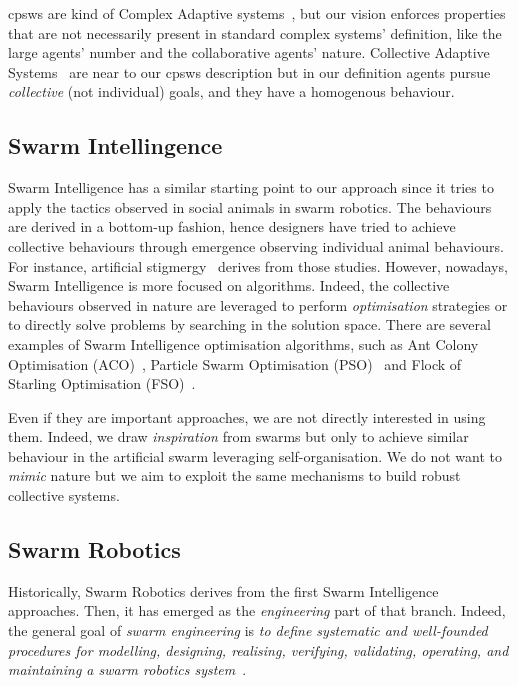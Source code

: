 \documentclass[11pt]{article}
\begin{document}
\acp{cpsw} are kind of Complex Adaptive systems~\cite{holland1992complex}, but our vision enforces properties that are not necessarily present in standard complex systems' definition, like the large agents' number and the collaborative agents' nature.
Collective Adaptive Systems~\cite{DBLP:journals/corr/abs-1108-5643} are near to our \acp{cpsw} description but in our definition agents pursue \emph{collective} (not individual) goals, and they have a homogenous behaviour.

\subsection{Swarm Intellingence}

Swarm Intelligence has a similar starting point to our approach since it tries to apply the tactics observed in social animals in swarm robotics. 
%
The behaviours are derived in a bottom-up fashion, hence designers have tried to achieve collective behaviours through emergence observing individual animal behaviours.
%
For instance, artificial stigmergy~\cite{DBLP:journals/fgcs/DorigoBT00} derives from those studies.
%
However, nowadays, Swarm Intelligence is more focused on algorithms.
% 
Indeed, the collective behaviours observed in nature are leveraged to perform \textit{optimisation} strategies or to directly solve problems by searching in the solution space.
There are several examples of Swarm Intelligence optimisation algorithms, such as Ant Colony Optimisation (ACO)~\cite{DBLP:journals/tsmc/DorigoMC96}, Particle Swarm Optimisation (PSO)~\cite{DBLP:conf/icnn/KennedyE95} and Flock of Starling Optimisation (FSO)~\cite{DBLP:series/sci/FulgineiS11}.

Even if they are important approaches, we are not directly interested in using them. 
%
Indeed, we draw \textit{inspiration} from swarms but only to achieve similar behaviour in the artificial swarm leveraging self-organisation. 
%
We do not want to \textit{mimic} nature but we aim to exploit the same mechanisms to build robust collective systems.

\subsection{Swarm Robotics}

Historically, Swarm Robotics derives from the first Swarm Intelligence approaches. 
%
Then, it has emerged as the \textit{engineering} part of that branch. 
%
Indeed, the general goal of \emph{swarm engineering} is \emph{to define systematic and well-founded procedures for modelling, designing, realising, verifying, validating, operating, and maintaining a swarm robotics system}~\cite{DBLP:journals/swarm/BrambillaFBD13}.
\end{document}

